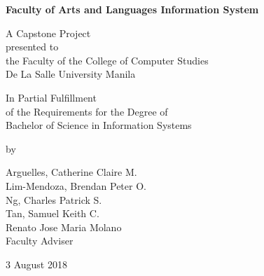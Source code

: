
\begin{titlepage}
\begin{center}

\textbf{
Faculty of Arts and Languages Information System
}

\vspace{5em}
A Capstone Project\\
presented to\\
the Faculty of the College of Computer Studies\\
De La Salle University Manila

\vspace{5em}
In Partial Fulfillment\\
of the Requirements for the Degree of\\
Bachelor of Science in Information Systems

\vspace{4em}

by\\

\vspace{4em}

Arguelles, Catherine Claire M.\\
Lim-Mendoza, Brendan Peter O.\\
Ng, Charles Patrick S.  \\
Tan, Samuel Keith C. \\


\vspace{4em}
Renato Jose Maria Molano\\
Faculty Adviser

\vspace{4em}
3 August 2018

\pagebreak
\end{center}
\end{titlepage}